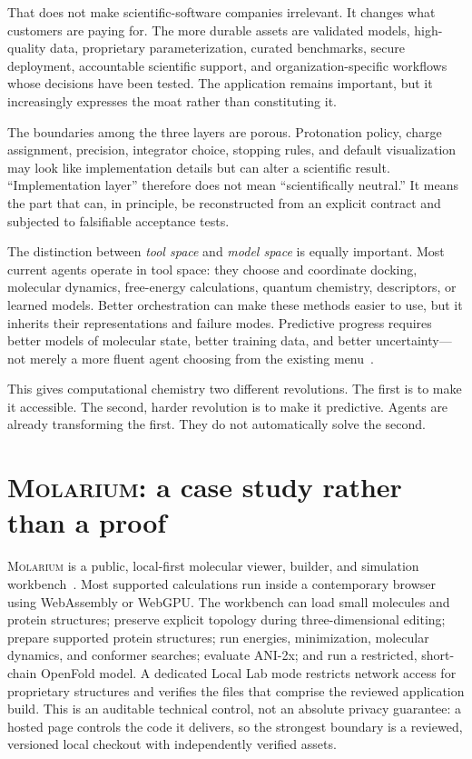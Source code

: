 \documentclass[11pt]{article}
\newcommand{\molarium}{\textnormal{\textsc{Molarium}}}
\begin{document}
That does not make scientific-software companies irrelevant.
It changes what customers are paying for.
The more durable assets are validated models, high-quality data, proprietary parameterization, curated benchmarks, secure deployment, accountable scientific support, and organization-specific workflows whose decisions have been tested.
The application remains important, but it increasingly expresses the moat rather than constituting it.

The boundaries among the three layers are porous.
Protonation policy, charge assignment, precision, integrator choice, stopping rules, and default visualization may look like implementation details but can alter a scientific result.
``Implementation layer'' therefore does not mean ``scientifically neutral.''
It means the part that can, in principle, be reconstructed from an explicit contract and subjected to falsifiable acceptance tests.

The distinction between \emph{tool space} and \emph{model space} is equally important.
Most current agents operate in tool space: they choose and coordinate docking, molecular dynamics, free-energy calculations, quantum chemistry, descriptors, or learned models.
Better orchestration can make these methods easier to use, but it inherits their representations and failure modes.
Predictive progress requires better models of molecular state, better training data, and better uncertainty---not merely a more fluent agent choosing from the existing menu~\cite{bender2021part1,bender2021part2,wigh2022representation}.

This gives computational chemistry two different revolutions.
The first is to make it accessible.
The second, harder revolution is to make it predictive.
Agents are already transforming the first.
They do not automatically solve the second.

\section{\molarium: a case study rather than a proof}
\label{sec:case}

\molarium{} is a public, local-first molecular viewer, builder, and simulation workbench~\cite{wiewiora2026molarium}.
Most supported calculations run inside a contemporary browser using WebAssembly or WebGPU.
The workbench can load small molecules and protein structures; preserve explicit topology during three-dimensional editing; prepare supported protein structures; run energies, minimization, molecular dynamics, and conformer searches; evaluate ANI-2x; and run a restricted, short-chain OpenFold model.
A dedicated Local Lab mode restricts network access for proprietary structures and verifies the files that comprise the reviewed application build.
This is an auditable technical control, not an absolute privacy guarantee: a hosted page controls the code it delivers, so the strongest boundary is a reviewed, versioned local checkout with independently verified assets.
\end{document}
